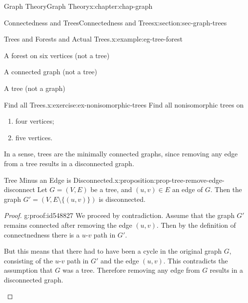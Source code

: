 \documentclass[oneside,10pt,]{book}
\numberwithin{equation}{section}
\begin{document}
\begin{chapterptx}{Graph Theory}{}{Graph Theory}{}{}{x:chapter:chap-graph}
\begin{sectionptx}{Connectedness and Trees}{}{Connectedness and Trees}{}{}{x:section:sec-graph-trees}
\begin{example}{Trees and Forests and Actual Trees.}{x:example:eg-tree-forest}
\begin{sidebyside}{4}{0.0275}{0.0275}{0.055}
\begin{sbspanel}{0.2}
A forest on six vertices (not a tree)%
\end{sbspanel}%
\begin{sbspanel}{0.2}%
\par
A connected graph (not a tree)%
\end{sbspanel}%
\begin{sbspanel}{0.18}%
\par
A tree (not a graph)%
\end{sbspanel}%
\end{sidebyside}%
\end{example}
\begin{inlineexercise}{Find all Trees.}{x:exercise:ex-nonisomorphic-trees}%
Find all nonisomorphic trees on%
\begin{enumerate}[label=(\alph*)]
\item{}four vertices;%
\item{}five vertices.%
\end{enumerate}
%
\end{inlineexercise}%
In a sense, trees are the minimally connected graphs, since removing any edge from a tree results in a disconnected graph.%
\begin{proposition}{Tree Minus an Edge is Disconnected.}{}{x:proposition:prop-tree-remove-edge-disconnect}%
Let \(G = (V,E)\) be a tree, and \((u,v) \in E\) an edge of \(G\). Then the graph \(G' = \left(V, E \setminus \{(u,v)\}\right)\) is disconnected.%
\end{proposition}
\begin{proof}{}{g:proof:id548827}
We proceed by contradiction. Assume that the graph \(G'\) remains connected after removing the edge \((u,v)\). Then by the definition of connectnedness there is a \(u\)-\(v\) path in \(G'\).%
\begin{sidebyside}{2}{0}{0}{0.07}%
\begin{sbspanel}{0.75}%
But this means that there had to have been a cycle in the original graph \(G\), consisting of the \(u\)-\(v\) path in \(G'\) and the edge \((u,v)\). This contradicts the assumption that \(G\) was a tree. Therefore removing any edge from \(G\) results in a disconnected graph.%
\end{sbspanel}%
\begin{sbspanel}{0.18}%
\end{sbspanel}
\end{sidebyside}
\end{proof}
\end{sectionptx}
\end{chapterptx}
\end{document}
